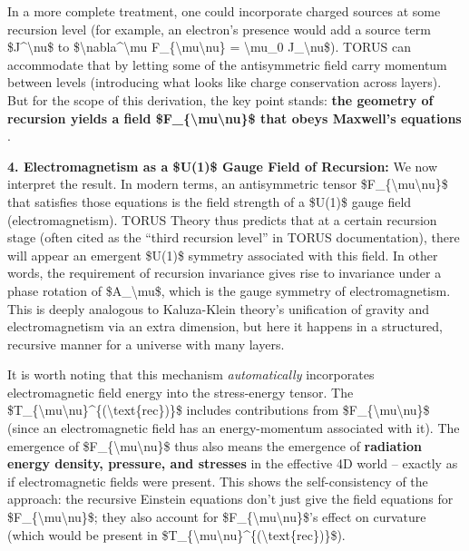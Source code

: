 \documentclass[]{article}
\begin{document}
In a more complete treatment, one could incorporate charged sources at
some recursion level (for example, an electron's presence would add a
source term \$J\^{}\textbackslash{}nu\$ to
\$\textbackslash{}nabla\^{}\textbackslash{}mu
F\_\{\textbackslash{}mu\textbackslash{}nu\} = \textbackslash{}mu\_0
J\_\textbackslash{}nu\$). TORUS can accommodate that by letting some of
the antisymmetric field carry momentum between levels (introducing what
looks like charge conservation across layers). But for the scope of this
derivation, the key point stands: \textbf{the geometry of recursion
yields a field \$F\_\{\textbackslash{}mu\textbackslash{}nu\}\$ that
obeys Maxwell's equations}​.

\textbf{4. Electromagnetism as a \$U(1)\$ Gauge Field of Recursion:} We
now interpret the result. In modern terms, an antisymmetric tensor
\$F\_\{\textbackslash{}mu\textbackslash{}nu\}\$ that satisfies those
equations is the field strength of a \$U(1)\$ gauge field
(electromagnetism). TORUS Theory thus predicts that at a certain
recursion stage (often cited as the ``third recursion level'' in TORUS
documentation), there will appear an emergent \$U(1)\$ symmetry
associated with this field​. In other words, the requirement of
recursion invariance gives rise to invariance under a phase rotation of
\$A\_\textbackslash{}mu\$, which is the gauge symmetry of
electromagnetism. This is deeply analogous to Kaluza-Klein theory's
unification of gravity and electromagnetism via an extra dimension, but
here it happens in a structured, recursive manner for a universe with
many layers.

It is worth noting that this mechanism \emph{automatically} incorporates
electromagnetic field energy into the stress-energy tensor. The
\$T\_\{\textbackslash{}mu\textbackslash{}nu\}\^{}\{(\textbackslash{}text\{rec\})\}\$
includes contributions from
\$F\_\{\textbackslash{}mu\textbackslash{}nu\}\$ (since an
electromagnetic field has an energy-momentum associated with it). The
emergence of \$F\_\{\textbackslash{}mu\textbackslash{}nu\}\$ thus also
means the emergence of \textbf{radiation energy density, pressure, and
stresses} in the effective 4D world -- exactly as if electromagnetic
fields were present. This shows the self-consistency of the approach:
the recursive Einstein equations don't just give the field equations for
\$F\_\{\textbackslash{}mu\textbackslash{}nu\}\$; they also account for
\$F\_\{\textbackslash{}mu\textbackslash{}nu\}\$'s effect on curvature
(which would be present in
\$T\_\{\textbackslash{}mu\textbackslash{}nu\}\^{}\{(\textbackslash{}text\{rec\})\}\$).
\end{document}
